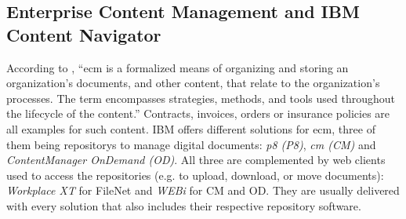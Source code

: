 


\subsection*{Enterprise Content Management and IBM Content Navigator}
According to , ``\ac{ecm} is a formalized means of organizing and storing an organization's documents, and other content, that relate to the organization's processes. The term encompasses strategies, methods, and tools used throughout the lifecycle of the content.'' Contracts, invoices, orders or insurance policies are all examples for such content. IBM offers different solutions for \ac{ecm}, three of them being \glspl{repository} to manage digital documents: \emph{\gls{p8} (P8)}, \emph{\gls{cm} (CM)} and \emph{ContentManager OnDemand (OD)}. All three are complemented by web clients used to access the repositories (e.g. to upload, download, or move documents): \emph{Workplace XT} for FileNet and \emph{WEBi} for CM and OD. They are usually delivered with every solution that also includes their respective repository software.

